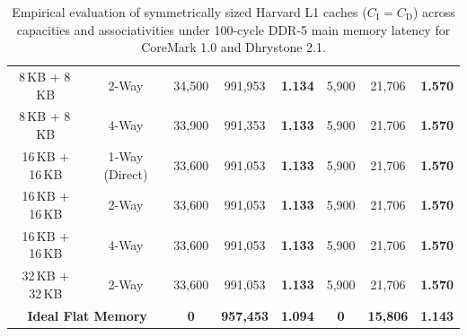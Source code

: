 \begin{table}[htbp]
{\begin{tabular}{|c|c|c|c|c|c|c|c|}
8\,KB + 8\,KB  & 2-Way          & 34,500    & 991,953   & \textbf{1.134} & 5,900  & 21,706 & \textbf{1.570} \\
8\,KB + 8\,KB  & 4-Way          & 33,900    & 991,353   & \textbf{1.133} & 5,900  & 21,706 & \textbf{1.570} \\
\hline
16\,KB + 16\,KB& 1-Way (Direct) & 33,600    & 991,053   & \textbf{1.133} & 5,900  & 21,706 & \textbf{1.570} \\
16\,KB + 16\,KB& 2-Way          & 33,600    & 991,053   & \textbf{1.133} & 5,900  & 21,706 & \textbf{1.570} \\
16\,KB + 16\,KB& 4-Way          & 33,600    & 991,053   & \textbf{1.133} & 5,900  & 21,706 & \textbf{1.570} \\
\hline
32\,KB + 32\,KB& 2-Way          & 33,600    & 991,053   & \textbf{1.133} & 5,900  & 21,706 & \textbf{1.570} \\
\hline
\multicolumn{2}{|c|}{\textbf{Ideal Flat Memory}} & \textbf{0} & \textbf{957,453} & \textbf{1.094} & \textbf{0} & \textbf{15,806} & \textbf{1.143} \\
\hline
\end{tabular}%
}
\caption{Empirical evaluation of symmetrically sized Harvard L1 caches ($C_{\text{I}} = C_{\text{D}}$) across capacities and associativities under 100-cycle DDR-5 main memory latency for CoreMark 1.0 and Dhrystone 2.1.}\label{tab:riscv_symmetric_cache_sweep}
\end{table}


